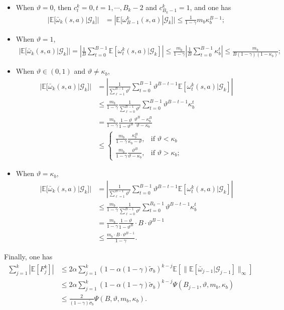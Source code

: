 \documentclass[10pt]{article}
\theoremstyle{plain}
\theoremstyle{definition}
\begin{document}
\begin{itemize}
    \item When $\vartheta=0$, then $c_t^k=0,t=1,\cdots,B_k-2$ and $c_{B_k-1}^k=1$, and one has
    \begin{align*}
|\mathbb{E}[\bar{\omega}_{k}(s,a)|\mathcal{G}_{k}]|&=|\mathbb{E}[{\omega}^{k}_{B-1}(s,a)|\mathcal{G}_{k}]|\leq \frac{1}{1-\gamma}m_b\kappa_b^{B-1};
\end{align*}
\item When $\vartheta=1$, 
\begin{align*}
|\mathbb{E}[\bar{\omega}_{k}(s,a)|\mathcal{G}_{k}]|=\left|\frac{1}{B}\sum_{t=0}^{B-1}\mathbb{E}[\omega_t^k(s,a)|\mathcal{G}_k]\right|\leq \frac{m_b}{1-\gamma}\left|\frac{1}{B}\sum_{t=0}^{B-1}\kappa_b^t\right|\leq \frac{m_b}{B(1-\gamma)(1-\kappa_b)};
\end{align*}
\item When $\vartheta\in(0,1)$ and $\vartheta\neq \kappa_b$,
\begin{align*}
|\mathbb{E}[\bar{\omega}_{k}(s,a)|\mathcal{G}_{k}]|&=\left|\frac{1}{\sum_{\ell=1}^{B-1}\vartheta^\ell}\sum_{t=0}^{B-1}\vartheta^{B-t-1}\mathbb{E}[\omega_t^k(s,a)|\mathcal{G}_k]\right|\\
&\leq\frac{m_b}{1-\gamma} \frac{1}{\sum_{\ell=0}^{B-1}\vartheta^\ell}\sum_{t=0}^{B-1}\vartheta^{B-t-1}\kappa_b^t\\
&=\frac{m_b}{1-\gamma}\frac{1-\vartheta}{1-\vartheta^{B}}\frac{\vartheta^{B}-\kappa_b^{B}}{\vartheta-\kappa_b}\\
&\leq \begin{cases}\displaystyle
\frac{m_b}{1-\gamma}\frac{\kappa_b^{B}}{\kappa_b-\vartheta},&\mbox{if }\vartheta<\kappa_b\\
\displaystyle\frac{m_b}{1-\gamma}\frac{\vartheta^{B}}{\vartheta-\kappa_b},&\mbox{if }\vartheta>\kappa_b;
\end{cases}
\end{align*}
\item When $\vartheta=\kappa_b$,
\begin{align*}
|\mathbb{E}[\bar{\omega}_{k}(s,a)|\mathcal{G}_{k}]|&=\left|\frac{1}{\sum_{\ell=1}^{B-1}\vartheta^\ell}\sum_{t=0}^{B-1}\vartheta^{B-t-1}\mathbb{E}[\omega_t^k(s,a)|\mathcal{G}_k]\right|\\
&\leq\frac{m_b}{1-\gamma} \frac{1}{\sum_{\ell=0}^{B-1}\vartheta^\ell}\sum_{t=0}^{B_k-1}\vartheta^{B-t-1}\kappa_b^t\\
&=\frac{m_b}{1-\gamma}\frac{1-\vartheta}{1-\vartheta^{B}}\cdot B\cdot\vartheta^{B-1}\\
&\leq \frac{m_b\cdot B\cdot \vartheta^{B-1}}{1-\gamma}.
\end{align*}
\end{itemize}
Finally, one has
\begin{align*}
\sum_{j=1}^k|\mathbb{E}[F_j^k]|&\le 2\alpha\sum_{j=1}^k (1-\alpha(1-\gamma)\tilde{\sigma}_b)^{k-j}\mathbb{E}[\|\mathbb{E}[\bar{\omega}_{j-1}|\mathcal{G}_{j-1}]\|_\infty]\\
&\le 2\alpha\sum_{j=1}^k(1-\alpha(1-\gamma)\tilde{\sigma}_b)^{k-j}\Psi(B_{j-1},\vartheta,m_b,\kappa_b)\\
&\leq \frac{2}{(1-\gamma)\tilde{\sigma}_b}\Psi({B},\vartheta,m_b,\kappa_b).
\end{align*}
\end{document}
